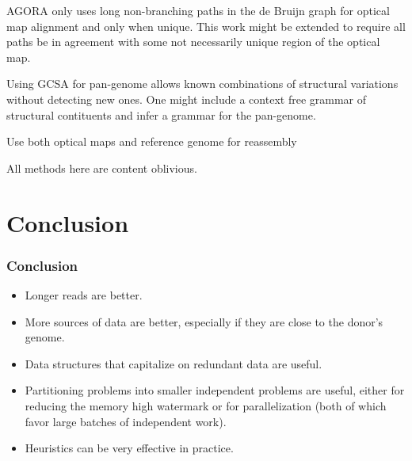 \documentclass{beamer}
\begin{document}
\begin{frame}
AGORA only uses long non-branching paths in the de Bruijn graph for optical map alignment and only when unique.  This work might be extended to require all paths be in agreement with some not necessarily unique region of the optical map.

\end{frame}
\begin{frame}
Using GCSA for pan-genome allows known combinations of structural variations without detecting new ones.  One might include a context free grammar of structural contituents and infer a grammar for the pan-genome.

\end{frame}
 
\begin{frame}
Use both optical maps and reference genome for reassembly

\end{frame}
\begin{frame}
All methods here are content oblivious.

\end{frame}



\section{Conclusion}
\begin{frame}
\frametitle{Conclusion}
\begin{itemize}
\item Longer reads are better. 
\item More sources of data are better, especially if they are close to the donor’s genome. 
\item Data structures that capitalize on redundant data are useful. 
\item Partitioning problems into smaller independent problems are useful, either for reducing the memory high watermark or for parallelization (both of which favor large batches of independent work). 
\item Heuristics can be very effective in practice.
\end{itemize}
\end{frame}
\end{document}
